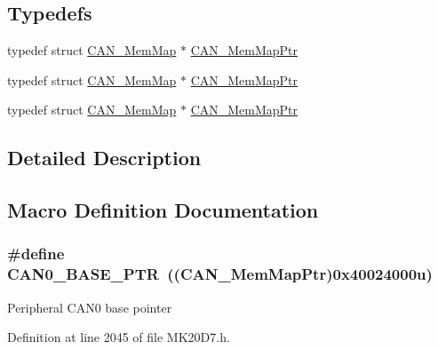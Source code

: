 \subsection*{Typedefs}
\begin{DoxyCompactItemize}
\item 
typedef struct \hyperlink{struct_c_a_n___mem_map}{C\+A\+N\+\_\+\+Mem\+Map} $\ast$ \hyperlink{group___c_a_n___peripheral_gadc219505f1f3c5212d1e670b3d57d9b6}{C\+A\+N\+\_\+\+Mem\+Map\+Ptr}
\item 
typedef struct \hyperlink{struct_c_a_n___mem_map}{C\+A\+N\+\_\+\+Mem\+Map} $\ast$ \hyperlink{group___c_a_n___peripheral_gadc219505f1f3c5212d1e670b3d57d9b6}{C\+A\+N\+\_\+\+Mem\+Map\+Ptr}
\item 
typedef struct \hyperlink{struct_c_a_n___mem_map}{C\+A\+N\+\_\+\+Mem\+Map} $\ast$ \hyperlink{group___c_a_n___peripheral_gadc219505f1f3c5212d1e670b3d57d9b6}{C\+A\+N\+\_\+\+Mem\+Map\+Ptr}
\end{DoxyCompactItemize}


\subsection{Detailed Description}


\subsection{Macro Definition Documentation}
\subsubsection[{\texorpdfstring{C\+A\+N0\+\_\+\+B\+A\+S\+E\+\_\+\+P\+TR}{CAN0_BASE_PTR}}]{\setlength{\rightskip}{0pt plus 5cm}\#define C\+A\+N0\+\_\+\+B\+A\+S\+E\+\_\+\+P\+TR~(({\bf C\+A\+N\+\_\+\+Mem\+Map\+Ptr})0x40024000u)}\hypertarget{group___c_a_n___peripheral_ga1ee8f499e10af9b8e3132e0168e519b9}{}\label{group___c_a_n___peripheral_ga1ee8f499e10af9b8e3132e0168e519b9}
Peripheral C\+A\+N0 base pointer 

Definition at line 2045 of file M\+K20\+D7.\+h.

